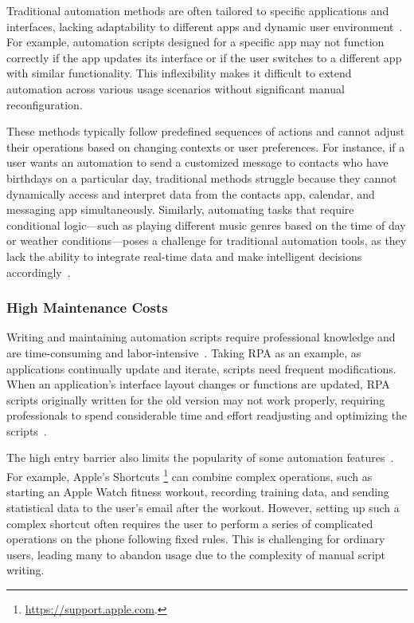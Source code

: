 Traditional automation methods are often tailored to specific applications and interfaces, lacking adaptability to different apps and dynamic user environment~\cite{clarke2016therapeutic,li2017sugilite,patel2015home,asadullah2016overview}. For example, automation scripts designed for a specific app may not function correctly if the app updates its interface or if the user switches to a different app with similar functionality. This inflexibility makes it difficult to extend automation across various usage scenarios without significant manual reconfiguration.

These methods typically follow predefined sequences of actions and cannot adjust their operations based on changing contexts or user preferences. For instance, if a user wants an automation to send a customized message to contacts who have birthdays on a particular day, traditional methods struggle because they cannot dynamically access and interpret data from the contacts app, calendar, and messaging app simultaneously. Similarly, automating tasks that require conditional logic—such as playing different music genres based on the time of day or weather conditions—poses a challenge for traditional automation tools, as they lack the ability to integrate real-time data and make intelligent decisions accordingly~\cite{majeed2020intelligent,liu2023understanding}.

\subsubsection{High Maintenance Costs}

Writing and maintaining automation scripts require professional knowledge and are time-consuming and labor-intensive~\cite{kodali2019low,kodali2017low,moreira2023process,lamberton2017impact,meironke2022measure}. Taking RPA as an example, as applications continually update and iterate, scripts need frequent modifications. When an application's interface layout changes or functions are updated, RPA scripts originally written for the old version may not work properly, requiring professionals to spend considerable time and effort readjusting and optimizing the scripts~\cite{tripathi2018learning,ling2020intelligent,agostinelli2022reactive}.

The high entry barrier also limits the popularity of some automation features~\cite{le2020shortcut,roffarello2024trigger}. For example, Apple's Shortcuts \footnote{\href{https://support.apple.com}{https://support.apple.com}.} can combine complex operations, such as starting an Apple Watch fitness workout, recording training data, and sending statistical data to the user's email after the workout. However, setting up such a complex shortcut often requires the user to perform a series of complicated operations on the phone following fixed rules. This is challenging for ordinary users, leading many to abandon usage due to the complexity of manual script writing.

